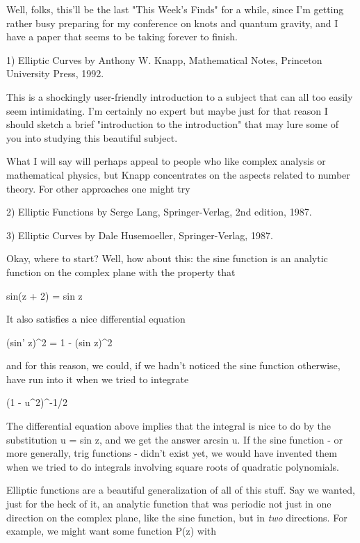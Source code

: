 

Well, folks, this'll be the last "This Week's Finds" for a while, since
I'm getting rather busy preparing for my conference on knots and quantum
gravity, and I have a paper that seems to be taking forever to finish.

1)  Elliptic Curves by Anthony W. Knapp, Mathematical Notes, Princeton
University Press, 1992.

This is a shockingly user-friendly introduction to a subject that can
all too easily seem intimidating.  I'm certainly no expert but maybe
just for that reason I should sketch a brief "introduction to the
introduction" that may lure some of you into studying this beautiful
subject.  

What I will say will perhaps appeal to people who like complex analysis
or mathematical physics, but Knapp concentrates on the aspects related
to number theory.  For other approaches one might try


2) Elliptic Functions by Serge Lang, Springer-Verlag, 2nd edition, 1987.

3) Elliptic Curves by Dale Husemoeller, Springer-Verlag, 1987.


Okay, where to start?  Well, how about this: the sine function is an
analytic function on the complex plane with the property that

                        sin(z + 2\pi ) = sin z

It also satisfies a nice differential equation

                        (sin' z)^{2} = 1 - (sin z)^{2} 

and for this reason, we could, if we hadn't noticed the sine function
otherwise, have run into it when we tried to integrate

                        (1 - u^{2})^{-1/2} 

The differential equation above implies that the integral is nice to do
by the substitution u = sin z, and we get the answer arcsin u.  If the
sine function - or more generally, trig functions - didn't exist yet, we
would have invented them when we tried to do integrals involving square roots
of quadratic polynomials.

Elliptic functions are a beautiful generalization of all of this stuff.
Say we wanted, just for the heck of it, an analytic function that was
periodic not just in one direction on the complex plane, like the sine
function, but in \emph{two} directions.  For example, we might want some
function P(z) with 

